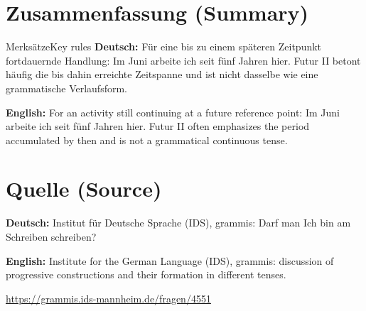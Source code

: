 \documentclass[a4paper,11pt]{article}
\newcommand{\GermanText}[1]{\textbf{Deutsch: }#1\par}
\newcommand{\EnglishText}[1]{{\small\color{SoftGray}\textbf{English: }#1\par}}
\begin{document}
\section{Zusammenfassung \textnormal{(Summary)}}
\begin{grammarentry}{Merksätze}{Key rules}
\GermanText{Für eine bis zu einem späteren Zeitpunkt fortdauernde Handlung: Im Juni arbeite ich seit fünf Jahren hier. Futur II betont häufig die bis dahin erreichte Zeitspanne und ist nicht dasselbe wie eine grammatische Verlaufsform.}
\EnglishText{For an activity still continuing at a future reference point: Im Juni arbeite ich seit fünf Jahren hier. Futur II often emphasizes the period accumulated by then and is not a grammatical continuous tense.}
\end{grammarentry}

\section{Quelle \textnormal{(Source)}}
        \GermanText{Institut für Deutsche Sprache (IDS), grammis: Darf man Ich bin am Schreiben schreiben?}
        \EnglishText{Institute for the German Language (IDS), grammis: discussion of progressive constructions and their formation in different tenses.}
        \url{https://grammis.ids-mannheim.de/fragen/4551}
\end{document}

